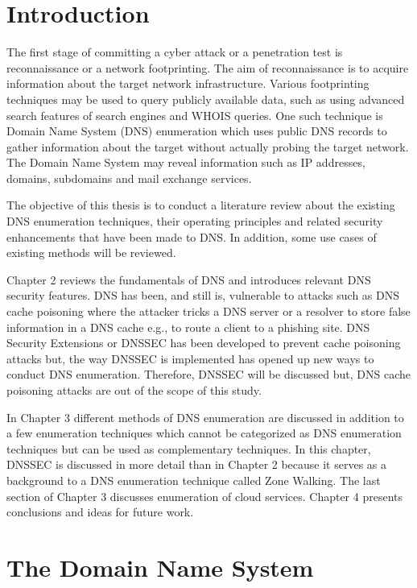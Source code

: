 
\section{Introduction}

The first stage of committing a cyber attack or a penetration test is reconnaissance or a network footprinting. The aim of reconnaissance is to acquire information about the target network infrastructure. Various footprinting techniques may be used to query publicly available data, such as using advanced search features of search engines and WHOIS queries. One such technique is Domain Name System (DNS) enumeration which uses public DNS records to gather information about the target without actually probing the target network. The Domain Name System may reveal information such as IP addresses, domains, subdomains and mail exchange services.

The objective of this thesis is to conduct a literature review about the existing DNS enumeration techniques, their operating principles and related security enhancements that have been made to DNS. In addition, some use cases of existing methods will be reviewed.

Chapter 2 reviews the fundamentals of DNS and introduces relevant DNS security features. DNS has been, and still is, vulnerable to attacks such as DNS cache poisoning where the attacker tricks a DNS server or a resolver to store false information in a DNS cache e.g., to route a client to a phishing site. DNS Security Extensions or DNSSEC has been developed to prevent cache poisoning attacks but, the way DNSSEC is implemented has opened up new ways to conduct DNS enumeration. Therefore, DNSSEC will be discussed but, DNS cache poisoning attacks are out of the scope of this study.

In Chapter 3 different methods of DNS enumeration are discussed in addition to a few enumeration techniques which cannot be categorized as DNS enumeration techniques but can be used as complementary techniques. In this chapter, DNSSEC is discussed in more detail than in Chapter 2 because it serves as a background to a DNS enumeration technique called Zone Walking. The last section of Chapter 3 discusses enumeration of cloud services. Chapter 4 presents conclusions and ideas for future work.


\section{The Domain Name System}

